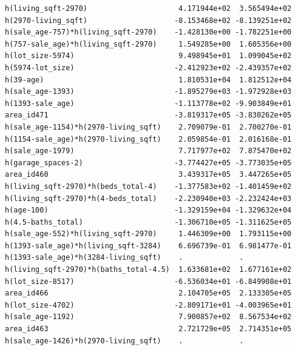 \documentclass[
]{article}
\begin{document}
\begin{verbatim}
h(living_sqft-2970)                     4.171944e+02  3.565494e+02
h(2970-living_sqft)                    -8.153468e+02 -8.139251e+02
h(sale_age-757)*h(living_sqft-2970)    -1.428130e+00 -1.782251e+00
h(757-sale_age)*h(living_sqft-2970)     1.549285e+00  1.605356e+00
h(lot_size-5974)                        9.498945e+01  1.099045e+02
h(5974-lot_size)                       -2.412923e+02 -2.439357e+02
h(39-age)                               1.810531e+04  1.812512e+04
h(sale_age-1393)                       -1.895279e+03 -1.972928e+03
h(1393-sale_age)                       -1.113778e+02 -9.903849e+01
area_id471                             -3.819317e+05 -3.830262e+05
h(sale_age-1154)*h(2970-living_sqft)    2.709079e-01  2.700270e-01
h(1154-sale_age)*h(2970-living_sqft)    2.059854e-01  2.016168e-01
h(sale_age-1979)                        7.717977e+02  7.875470e+02
h(garage_spaces-2)                     -3.774427e+05 -3.773035e+05
area_id460                              3.439317e+05  3.447265e+05
h(living_sqft-2970)*h(beds_total-4)    -1.377583e+02 -1.401459e+02
h(living_sqft-2970)*h(4-beds_total)    -2.230940e+03 -2.232424e+03
h(age-100)                             -1.329159e+04 -1.329632e+04
h(4.5-baths_total)                     -1.306710e+05 -1.311625e+05
h(sale_age-552)*h(living_sqft-2970)     1.446309e+00  1.793115e+00
h(1393-sale_age)*h(living_sqft-3284)    6.696739e-01  6.981477e-01
h(1393-sale_age)*h(3284-living_sqft)    .             .           
h(living_sqft-2970)*h(baths_total-4.5)  1.633681e+02  1.677161e+02
h(lot_size-8517)                       -6.536034e+01 -6.849908e+01
area_id466                              2.104705e+05  2.133305e+05
h(lot_size-4702)                       -2.809171e+01 -4.003965e+01
h(sale_age-1192)                        7.900857e+02  8.567534e+02
area_id463                              2.721729e+05  2.714351e+05
h(sale_age-1426)*h(2970-living_sqft)    .             .           
                                                                  

\end{verbatim}
\end{document}
